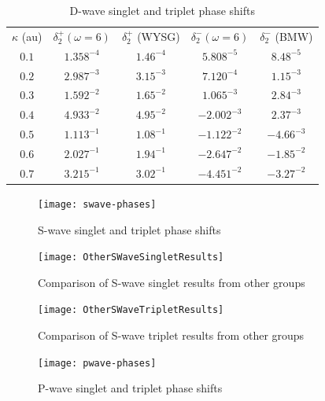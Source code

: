 \documentclass[preprint,showpacs,preprintnumbers,amsmath,amssymb]{revtex4}
\newcommand{\todoi}{\todo[inline]}
\begin{document}
\begin{table}[H]
\begin{center}
\begin{ruledtabular}
\begin{tabular}{c c c c c}
$\kappa$ (au) & $\delta_2^+ (\omega = 6)$ & $\delta_2^+$ (WYSG) & $\delta_2^- (\omega = 6)$ & $\delta_2^-$ (BMW) \\
\colrule
$0.1$ & $1.358^{-4}$ & $1.46^{-4}$ & $5.808^{-5}$ & $8.48^{-5}$ \\
$0.2$ & $2.987^{-3}$ & $3.15^{-3}$ & $7.120^{-4}$ & $1.15^{-3}$ \\
$0.3$ & $1.592^{-2}$ & $1.65^{-2}$ & $1.065^{-3}$ & $2.84^{-3}$ \\
$0.4$ & $4.933^{-2}$ & $4.95^{-2}$ & $-2.002^{-3}$ & $2.37^{-3}$ \\
$0.5$ & $1.113^{-1}$ & $1.08^{-1}$ & $-1.122^{-2}$ & $-4.66^{-3}$ \\
$0.6$ & $2.027^{-1}$ & $1.94^{-1}$ & $-2.647^{-2}$ & $-1.85^{-2}$ \\
$0.7$ & $3.215^{-1}$ & $3.02^{-1}$ & $-4.451^{-2}$ & $-3.27^{-2}$ \\
\end{tabular}
\end{ruledtabular}
\caption{D-wave singlet and triplet phase shifts}
\label{tab:DWavePhase}
\end{center}
\end{table}


\begin{figure}[ht]
	\centering
	\texttt{[image: swave-phases]}
	\caption{S-wave singlet and triplet phase shifts}
	\label{fig:swave-phases}
\end{figure}

\begin{figure}[H]
	\centering
	\texttt{[image: OtherSWaveSingletResults]}
	\caption{Comparison of S-wave singlet results from other groups}
	\label{fig:OtherSWaveSingletResults}
\end{figure}

\begin{figure}[H]
	\centering
	\texttt{[image: OtherSWaveTripletResults]}
	\caption{Comparison of S-wave triplet results from other groups}
	\label{fig:OtherSWaveTripletResults}
\end{figure}
\todoi{Need this one?}


\begin{figure}[H]
	\centering
	\texttt{[image: pwave-phases]}
	\caption{P-wave singlet and triplet phase shifts}
	\label{fig:pwave-phases}
\end{figure}
\end{document}
